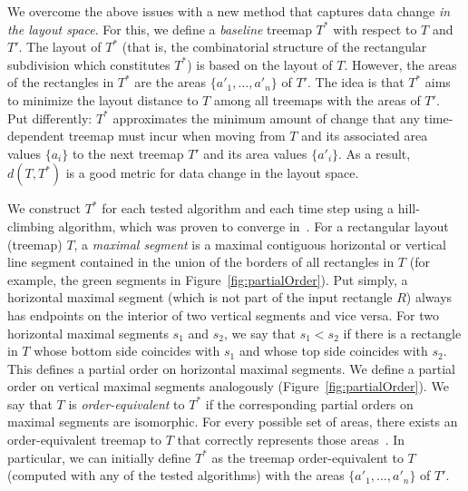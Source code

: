  We overcome the above issues with a new method that captures data change \emph{in the layout space}. For this, we define a \emph{baseline} treemap $T^*$ with respect to $T$ and $T'$. The layout of $T^*$ (that is, the combinatorial structure of the rectangular subdivision which constitutes $T^*$) is based on the layout of $T$. However, the areas of the rectangles in $T^*$ are the areas $\{a'_1, \ldots, a'_n\}$ of $T'$. The idea is that $T^*$ aims to minimize the layout distance to $T$ among all treemaps with the areas of $T'$. Put differently: $T^*$ approximates the minimum amount of change that any time-dependent treemap must incur when moving from $T$ and its associated area values $\{a_i\}$ to the next treemap $T'$ and its area values $\{a'_i\}$. As a result, $d(T, T^*)$ is a good metric for data change in the layout space.

We construct $T^*$ for each tested algorithm and each time step using a hill-climbing algorithm, which was proven to converge in~\cite{eppstein2009area}. For a rectangular layout (treemap) $T$, a \emph{maximal segment} is a maximal contiguous horizontal or vertical line segment contained in the union of the borders of all rectangles in $T$ (for example, the green segments in Figure~\ref{fig:partialOrder}). Put simply, a horizontal maximal segment (which is not part of the input rectangle $R$) always has endpoints on the interior of two vertical segments and vice versa. For two horizontal maximal segments $s_1$ and $s_2$, we say that $s_1 < s_2$ if there is a rectangle in $T$ whose bottom side coincides with $s_1$ and whose top side coincides with $s_2$. This defines a partial order on horizontal maximal segments. We define a partial order on vertical maximal segments analogously (Figure~\ref{fig:partialOrder}). We say that $T$ is \emph{order-equivalent} to $T^*$ if the corresponding partial orders on maximal segments are isomorphic. For every possible set of areas, there exists an order-equivalent treemap to $T$ that correctly represents those areas~\cite{eppstein2009area}. In particular, we can initially define $T^*$ as the treemap order-equivalent to $T$ (computed with any of the tested algorithms) with the areas $\{a'_1, \ldots, a'_n\}$ of $T'$.

